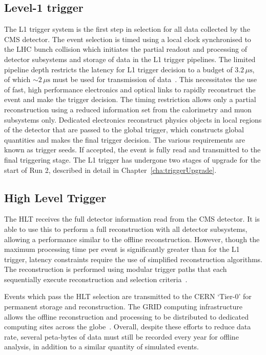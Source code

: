 \subsection{Level-1 trigger}

The L1 trigger system is the first step in selection for all data collected by the CMS detector. The event selection 
is timed using a local clock synchronised to the LHC bunch collision which initiates the partial readout and processing of 
detector subsystems and storage of data in the L1 trigger pipelines. The limited pipeline depth restricts the latency for L1 trigger decision to a budget of $3.2\,\mu\text{s}$,
of which $\sim2\,\mu\text{s}$ must be used for transmission of data~\cite{daq_performance}. This necessitates the use of fast, high performance electronics
and optical links to rapidly reconstruct the event and make the trigger decision. The timing restriction allows only 
a partial reconstruction using a reduced information set from the calorimetry and muon subsystems only. Dedicated electronics
reconstruct physics objects in local regions of the detector that are passed to the global trigger, which constructs global
quantities and makes the final trigger decision. The various requirements are known as trigger seeds. 
If accepted, the event is fully read and transmitted to the final triggering
stage. The L1 trigger has undergone two stages of upgrade for the start of Run 2, described in detail in Chapter~\ref{cha:triggerUpgrade}.

\subsection{High Level Trigger}

The HLT receives the full detector information read from the CMS detector. It is able to use this to perform 
a full reconstruction with all detector subsystems, allowing a performance similar to the offline reconstruction. However, 
though the maximum processing time per event is significantly greater than for the L1 trigger, latency constraints 
require the use of simplified reconstruction algorithms. The reconstruction is performed using modular trigger paths
that each sequentially execute reconstruction and selection criteria~\cite{daq_performance}. 

Events which pass the HLT selection are transmitted to the CERN `Tier-0' for permanent storage and reconstruction. 
The GRID computing infrastructure allows the offline reconstruction and processing to be distributed to dedicated 
computing sites across the globe~\cite{grid_tdr}. Overall, despite these efforts to reduce data rate, 
several peta-bytes of data must still be recorded every year for offline analysis, in addition to 
a similar quantity of simulated events.

